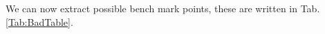 We can now extract possible bench mark points, these are written in Tab.\,\ref{Tab:BadTable}.
%

%

